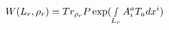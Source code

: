 \begin{equation}
W(L_{r},\rho _{r})=Tr_{\rho _{r}}P\exp (\smallint
_{L_{r}}A_{i}^{a}T_{a}dx^{i})  \label{33}
\end{equation}

